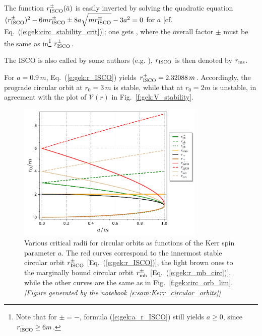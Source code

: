 The function $r_{\rm ISCO}^\pm(\bar{a})$ is easily inverted by solving
the quadratic equation $(r_{\rm ISCO}^\pm)^2 - 6 m r_{\rm ISCO}^\pm \pm 8 a \sqrt{m r_{\rm ISCO}^\pm} - 3 a^2 = 0$ for $a$
[cf. Eq.~(\ref{e:gek:circ_stability_crit})]; one gets
\be \label{e:gek:a_r_ISCO}
      ,
\ee
where the overall factor $\pm$ must be the same as in\footnote{Note that
for $\pm=-$, formula (\ref{e:gek:a_r_ISCO}) still yields $a\geq 0$, since
$r_{\rm ISCO}^- \geq 6 m$.} $r_{\rm ISCO}^\pm$.

\begin{remark}
The ISCO is also called  by some authors (e.g. \cite{BardePT72}), $r_{\rm ISCO}$ is then denoted by $r_{\rm ms}$.
\end{remark}

\begin{example}
For $a = 0.9\, m$, Eq.~(\ref{e:gek:r_ISCO}) yields $r_{\rm ISCO}^+ = 2.32088\, m$. Accordingly,
the prograde circular orbit at $r_0 = 3\, m$ is stable, while that at $r_0 = 2 m$ is unstable,
in agreement with the plot of $\mathcal{V}(r)$ in Fig.~\ref{f:gek:V_stability}.
\end{example}

\begin{figure}
\centerline{\includegraphics[width=0.8\textwidth]{gek_circ_orb_isco.pdf}}
\caption[]{\label{f:gek:circ_orb_isco} \footnotesize
Various critical radii for circular orbits as functions of the Kerr spin parameter $a$.
The red curves correspond to the innermost stable circular orbit $r_{\rm ISCO}^\pm$ [Eq.~(\ref{e:gek:r_ISCO})], the light brown ones to the marginally bound circular orbit
$r_{\rm mb}^\pm$ [Eq.~(\ref{e:gek:r_mb_circ})],
while the other curves are the same as in Fig.~\ref{f:gek:circ_orb_lim}.
\textsl{[Figure generated by the notebook \ref{s:sam:Kerr_circular_orbits}]}
}
\end{figure}

